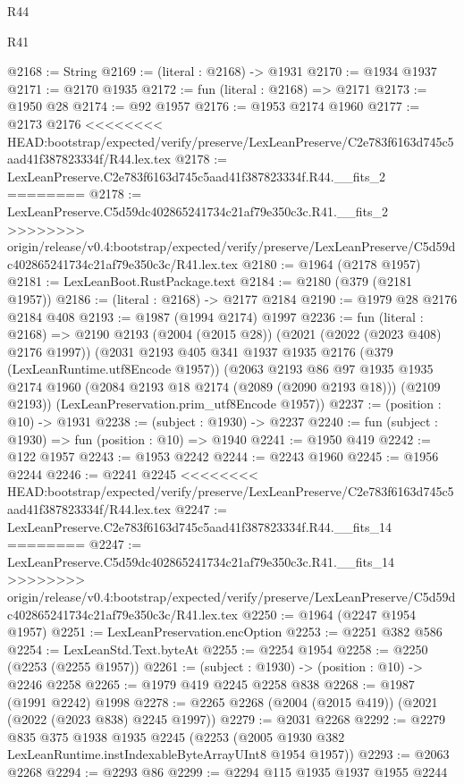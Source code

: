 \begin{lexlean}{R44}
\begin{lexlean}{R41}
\begin{coremodule}
{{{{{{{{{{{{{{{{{{{{{{{{{{{{{{{{{{{{{{{{{{{{{{{{{{{{{{{{{{{{{{{{{{{{{{{{{{{{{{{{{{{{{{{@2168 := String
@2169 := (literal : @2168) -> @1931
@2170 := @1934 @1937
@2171 := @2170 @1935
@2172 := fun (literal : @2168) => @2171
@2173 := @1950 @28
@2174 := @92 @1957
@2176 := @1953 @2174 @1960
@2177 := @2173 @2176
<<<<<<<< HEAD:bootstrap/expected/verify/preserve/LexLeanPreserve/C2e783f6163d745c5aad41f387823334f/R44.lex.tex
@2178 := LexLeanPreserve.C2e783f6163d745c5aad41f387823334f.R44.__fits_2
========
@2178 := LexLeanPreserve.C5d59dc402865241734c21af79e350c3c.R41.__fits_2
>>>>>>>> origin/release/v0.4:bootstrap/expected/verify/preserve/LexLeanPreserve/C5d59dc402865241734c21af79e350c3c/R41.lex.tex
@2180 := @1964 (@2178 @1957)
@2181 := LexLeanBoot.RustPackage.text
@2184 := @2180 (@379 (@2181 @1957))
@2186 := (literal : @2168) -> @2177 @2184
@2190 := @1979 @28 @2176 @2184 @408
@2193 := @1987 (@1994 @2174) @1997
@2236 := fun (literal : @2168) =>
  @2190
    @2193
    (@2004 (@2015 @28))
    (@2021 (@2022 (@2023 @408) @2176 @1997))
    (@2031
      @2193
      @405
      @341
      @1937
      @1935
      @2176
      (@379 (LexLeanRuntime.utf8Encode @1957))
      (@2063
        @2193
        @86
        @97
        @1935
        @1935
        @2174
        @1960
        (@2084 @2193 @18 @2174 (@2089 (@2090 @2193 @18)))
        (@2109 @2193))
      (LexLeanPreservation.prim_utf8Encode @1957))
@2237 := (position : @10) -> @1931
@2238 := (subject : @1930) -> @2237
@2240 := fun (subject : @1930) => fun (position : @10) => @1940
@2241 := @1950 @419
@2242 := @122 @1957
@2243 := @1953 @2242
@2244 := @2243 @1960
@2245 := @1956 @2244
@2246 := @2241 @2245
<<<<<<<< HEAD:bootstrap/expected/verify/preserve/LexLeanPreserve/C2e783f6163d745c5aad41f387823334f/R44.lex.tex
@2247 := LexLeanPreserve.C2e783f6163d745c5aad41f387823334f.R44.__fits_14
========
@2247 := LexLeanPreserve.C5d59dc402865241734c21af79e350c3c.R41.__fits_14
>>>>>>>> origin/release/v0.4:bootstrap/expected/verify/preserve/LexLeanPreserve/C5d59dc402865241734c21af79e350c3c/R41.lex.tex
@2250 := @1964 (@2247 @1954 @1957)
@2251 := LexLeanPreservation.encOption
@2253 := @2251 @382 @586
@2254 := LexLeanStd.Text.byteAt
@2255 := @2254 @1954
@2258 := @2250 (@2253 (@2255 @1957))
@2261 := (subject : @1930) -> (position : @10) -> @2246 @2258
@2265 := @1979 @419 @2245 @2258 @838
@2268 := @1987 (@1991 @2242) @1998
@2278 := @2265 @2268 (@2004 (@2015 @419)) (@2021 (@2022 (@2023 @838) @2245 @1997))
@2279 := @2031 @2268
@2292 := @2279
    @835
    @375
    @1938
    @1935
    @2245
    (@2253 (@2005 @1930 @382 LexLeanRuntime.instIndexableByteArrayUInt8 @1954 @1957))
@2293 := @2063 @2268
@2294 := @2293 @86
@2299 := @2294 @115 @1935 @1937 @1955 @2244
}}}}}}}}}}}}}}}}}}}}}}}}}}}}}}}}}}}}}}}}}}}}}}}}}}}}}}}}}}}}}}}}}}}}}}}}}}}}}}}}}}}}}}}
\end{coremodule}
\end{lexlean}
\end{lexlean}
